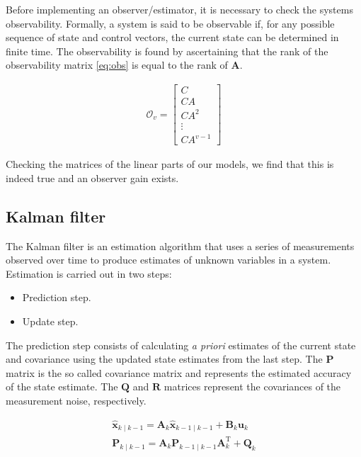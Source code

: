 Before implementing an observer/estimator, it is necessary to check the  systems observability.
Formally, a system is said to be observable if, for any possible sequence of state and control vectors, the current state can be determined in finite time.
The observability is found by ascertaining that the rank of the observability matrix \eqref{eq:obs} is equal to the rank of $\mathbf{A}$.

\begin{align}\label{eq:obs}
\mathcal{O}_v=\begin{bmatrix} C \\ CA \\ CA^2 \\ \vdots \\ CA^{v-1} \end{bmatrix}
\end{align}

Checking the matrices of the linear parts of our models, we find that this is indeed true and an observer gain exists.

\subsection{Kalman filter}
The Kalman filter is an estimation algorithm that uses a series of measurements observed over time to produce estimates of unknown variables in a system.
Estimation is carried out in two steps:

\begin{itemize}
\item Prediction step.
\item Update step.
\end{itemize} 

The prediction step consists of calculating \textit{a priori} estimates of the current state and covariance using the updated state estimates from the last step. 
The $\mathbf{P}$ matrix is the so called covariance matrix and represents the estimated accuracy of the state estimate.
The $\mathbf{Q}$ and $\mathbf{R}$ matrices represent the covariances of the measurement noise, respectively.

\begin{gather}
\hat{\mathbf{x}}_{k\mid k-1} = \mathbf{A}_{k}\hat{\mathbf{x}}_{k-1\mid k-1} + \mathbf{B}_{k} \mathbf{u}_{k} \\
\mathbf{P}_{k\mid k-1} =  \mathbf{A}_{k} \mathbf{P}_{k-1\mid k-1} \mathbf{A}_{k}^{\text{T}} + \mathbf{Q}_{k} 
\end{gather}

